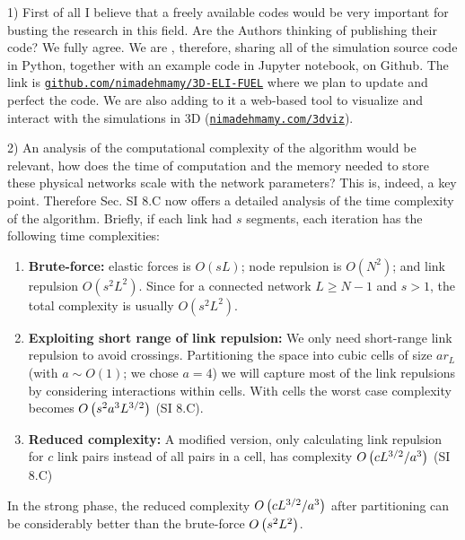 \documentclass[11pt]{article}
\begin{document}
\begin{response}{
1) First of all I believe that a freely available codes would be very important for busting the research in this field. Are the Authors thinking of publishing their code?
}
We fully agree. 
We are , therefore, sharing 
all of the simulation source code in Python, together with an example code in Jupyter notebook, on Github. 
The link is \texttt{\href{https://github.com/nimadehmamy/3D-ELI-FUEL}{github.com/nimadehmamy/3D-ELI-FUEL}} where we plan to update and perfect the code. 
We are also adding to it a web-based tool to visualize and interact with the simulations in 3D (\texttt{\href{http://nimadehmamy.com/3dviz}{nimadehmamy.com/3dviz}}).

\end{response}
\begin{response}{
2) An analysis of the computational complexity of the algorithm would be relevant, how does the time of computation and the memory needed to store these physical networks scale with the network parameters?
}
This is, indeed, a key point. 
Therefore Sec. SI 8.C now offers a detailed analysis of the time complexity of the algorithm. 
Briefly, if each link had $s$ segments, each iteration has the following time complexities:
\begin{enumerate}
    \item {\bf Brute-force:}  elastic forces is $O(sL)$;  node repulsion is $O(N^2)$; and link repulsion $O(s^2L^2)$. 
    Since for a connected network $L\geq N-1$ and $s>1$, the total complexity is usually $O(s^2L^2)$.  
    \item {\bf Exploiting short range of link repulsion:}
    We only need short-range link repulsion to avoid crossings. 
    Partitioning the space into cubic cells of size $ar_L$ (with $a \sim O(1)$; we chose $a=4$) we will capture most of the link repulsions by considering interactions within cells.
    With cells the worst case complexity becomes $O\left(s^2a^3 L^{3/2}\right)$ (SI 8.C).
    \item {\bf Reduced complexity:} 
    A modified version, only calculating link repulsion for $c$ link pairs instead of all pairs in a cell, has complexity 
    $O\left(c L^{3/2}/ a^3\right)$ (SI 8.C)
\end{enumerate}
In the strong phase, the reduced complexity $O\left(c L^{3/2}/ a^3\right)$ after partitioning can be considerably better than the brute-force  $O\left(s^2 L^{2}\right)$.

\end{response}
\end{document}
